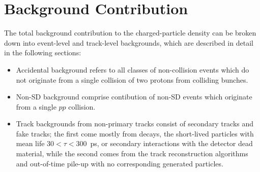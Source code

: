 \section{Background Contribution}\label{section:star_background}
The total background contribution to the charged-particle density can be broken down into
event-level and track-level backgrounds, which are described in detail in the following sections:
\begin{itemize}
	\item Accidental background refers to all classes of non-collision events which do not originate from a single collision of two protons from colliding bunches.
	\item Non-SD background comprise contibution of non-SD events which originate from a single $pp$ collision.
	\item Track backgrounds from non-primary tracks consist of secondary tracks and fake tracks; the first come mostly from decays, the short-lived particles with mean life $30 < \tau < 300$~ps, or secondary interactions with the detector dead material, while the second comes from the track reconstruction algorithms and out-of-time pile-up with
	no corresponding generated particles.
\end{itemize}



